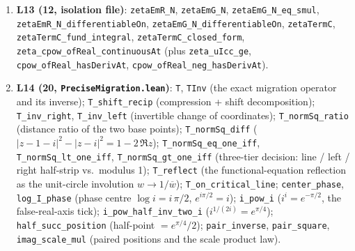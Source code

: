 \documentclass{article}
\begin{document}
{\begin{sloppypar}
\begin{enumerate}
\texttt{zeta\_line\_two\_bounded}, \texttt{Gamma\_one\_add\_it\_norm\_le\_one},
\texttt{zeta\_ne\_zero\_on\_bottom\_edge}, \texttt{zeta\_im\_zero\_on\_real},
\texttt{zeta\_neg\_one\_re\_neg}, \texttt{bottom\_edge\_arg\_jump},
\texttt{zeta\_partial\_sum\_lt\_integral\_bound}.
\item \textbf{L13 (12, isolation file)}: \texttt{zetaEmR\_N},
\texttt{zetaEmG\_N}, \texttt{zetaEmG\_N\_eq\_smul},
\texttt{zetaEmR\_N\_differentiableOn}, \texttt{zetaEmG\_N\_differentiableOn},
\texttt{zetaTermC}, \texttt{zetaTermC\_fund\_integral},
\texttt{zetaTermC\_closed\_form}, \texttt{zeta\_cpow\_ofReal\_continuousAt}
(plus \texttt{zeta\_uIcc\_ge}, \texttt{cpow\_ofReal\_hasDerivAt},
\texttt{cpow\_ofReal\_neg\_hasDerivAt}).
\item \textbf{L14 (20, \texttt{PreciseMigration.lean})}: \texttt{T},
\texttt{TInv} (the exact migration operator and its inverse);
\texttt{T\_shift\_recip} (compression + shift decomposition);
\texttt{T\_inv\_right}, \texttt{T\_inv\_left} (invertible change of
coordinates); \texttt{T\_normSq\_ratio} (distance ratio of the two
base points); \texttt{T\_normSq\_diff} ($|z-1-i|^2-|z-i|^2=1-2\,\Re z$);
\texttt{T\_normSq\_eq\_one\_iff}, \texttt{T\_normSq\_lt\_one\_iff},
\texttt{T\_normSq\_gt\_one\_iff} (three-tier decision: line / left /
right half-strip vs.\ modulus 1); \texttt{T\_reflect} (the
functional-equation reflection as the unit-circle involution
$w\to 1/\overline w$); \texttt{T\_on\_critical\_line}; \texttt{center\_phase},
\texttt{log\_I\_phase} (phase centre $\log i=i\,\pi/2$, $e^{i\pi/2}=i$);
\texttt{i\_pow\_i} ($i^i=e^{-\pi/2}$, the false-real-axis tick);
\texttt{i\_pow\_half\_inv\_two\_i} ($i^{1/(2i)}=e^{\pi/4}$);
\texttt{half\_succ\_position} (half-point $=e^{\pi/4}/2$);
\texttt{pair\_inverse}, \texttt{pair\_square}, \texttt{imag\_scale\_mul}
(paired positions and the scale product law).
\end{enumerate}
\end{sloppypar}}
\end{document}
